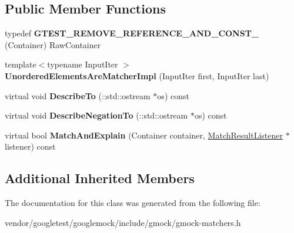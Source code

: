 \subsection*{Public Member Functions}
\begin{DoxyCompactItemize}
\item 
\mbox{\label{classtesting_1_1internal_1_1_unordered_elements_are_matcher_impl_a6e8b7d421741a66ee7f2ebff7372897e}} 
typedef {\bfseries G\+T\+E\+S\+T\+\_\+\+R\+E\+M\+O\+V\+E\+\_\+\+R\+E\+F\+E\+R\+E\+N\+C\+E\+\_\+\+A\+N\+D\+\_\+\+C\+O\+N\+S\+T\+\_\+} (Container) Raw\+Container
\item 
\mbox{\label{classtesting_1_1internal_1_1_unordered_elements_are_matcher_impl_a0b0f40cf4de84f14020c3d4c9ba06c42}} 
{\footnotesize template$<$typename Input\+Iter $>$ }\\{\bfseries Unordered\+Elements\+Are\+Matcher\+Impl} (Input\+Iter first, Input\+Iter last)
\item 
\mbox{\label{classtesting_1_1internal_1_1_unordered_elements_are_matcher_impl_a3f6e292c6452db028b7671618577d9f0}} 
virtual void {\bfseries Describe\+To} (\+::std\+::ostream $\ast$os) const
\item 
\mbox{\label{classtesting_1_1internal_1_1_unordered_elements_are_matcher_impl_af2185915595c02d6132ba5f3f9ccb6cd}} 
virtual void {\bfseries Describe\+Negation\+To} (\+::std\+::ostream $\ast$os) const
\item 
\mbox{\label{classtesting_1_1internal_1_1_unordered_elements_are_matcher_impl_a4031291eef9be8c1e9e1effdd02c4334}} 
virtual bool {\bfseries Match\+And\+Explain} (Container container, \mbox{\hyperlink{classtesting_1_1_match_result_listener}{Match\+Result\+Listener}} $\ast$listener) const
\end{DoxyCompactItemize}
\subsection*{Additional Inherited Members}


The documentation for this class was generated from the following file\+:\begin{DoxyCompactItemize}
\item 
vendor/googletest/googlemock/include/gmock/gmock-\/matchers.\+h\end{DoxyCompactItemize}
